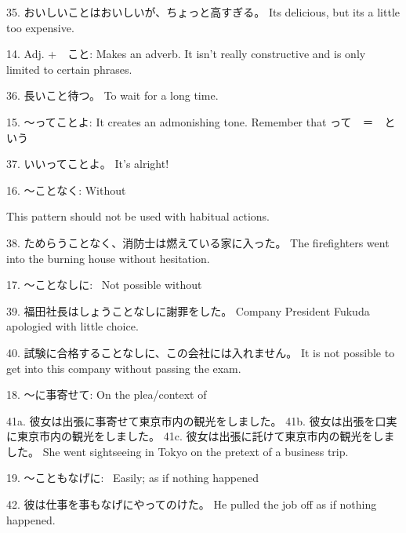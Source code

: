 \par{35. おいしいことはおいしいが、ちょっと高すぎる。 \hfill\break
It\textquotesingle s delicious, but it\textquotesingle s a little too expensive. }
 
\par{14. Adj. +　こと: Makes an adverb. It isn't really constructive and is only limited to certain phrases. }
 
\par{36. 長いこと待つ。 \hfill\break
To wait for a long time. }
 
\par{15. ～ってことよ: It creates an admonishing tone. Remember that って　＝　という }
 
\par{37. いいってことよ。 \hfill\break
It's alright! }
 
\par{16. ～ことなく: Without }
 
\par{ This pattern should not be used with habitual actions. }
 
\par{38. ためらうことなく、消防士は燃えている家に入った。 \hfill\break
The firefighters went into the burning house without hesitation. }
 
\par{17. ～ことなしに:  Not possible without }
 
\par{39. 福田社長はしょうことなしに謝罪をした。 \hfill\break
Company President Fukuda apologied with little choice. }
 
\par{40. 試験に合格することなしに、この会社には入れません。 \hfill\break
It is not possible to get into this company without passing the exam. }
 
\par{18. ～に事寄せて: On the plea\slash context of }
 
\par{41a. 彼女は出張に事寄せて東京市内の観光をしました。 \hfill\break
41b. 彼女は出張を口実に東京市内の観光をしました。 \hfill\break
41c. 彼女は出張に託けて東京市内の観光をしました。 \hfill\break
She went sightseeing in Tokyo on the pretext of a business trip. }
 
\par{19.  ～こともなげに:  Easily; as if nothing happened }
 
\par{42. 彼は仕事を事もなげにやってのけた。 \hfill\break
He pulled the job off as if nothing happened. }
 
